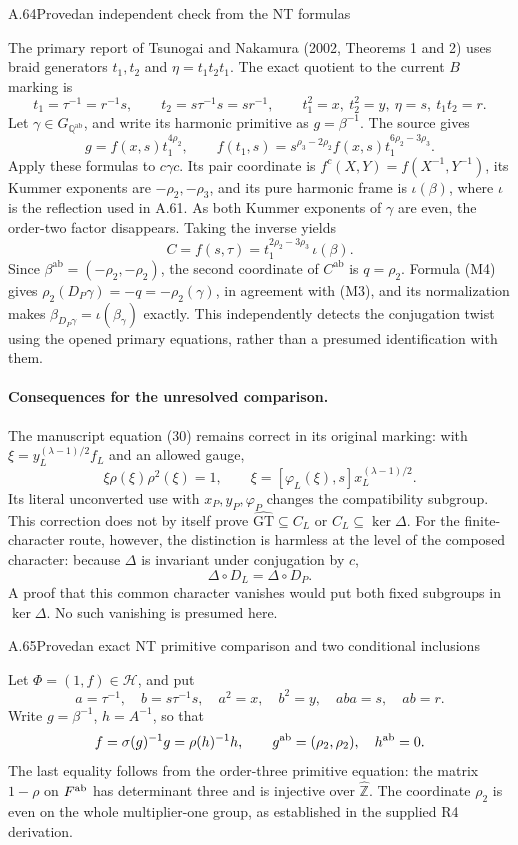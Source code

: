 \begin{statement}{A.64}{Proved}{an independent check from the NT formulas}
\citep[Theorems 1 and 2]{LitTsunogaiNakamura2002}
\end{statement}
The primary report of Tsunogai and Nakamura (2002, Theorems 1 and 2)
uses braid generators $t_1,t_2$ and $\eta=t_1t_2t_1$.
The exact quotient to the current $B$ marking is
\[
 t_1=\tau^{-1}=r^{-1}s,\qquad t_2=s\tau^{-1}s=sr^{-1},
 \qquad t_1^2=x,\ t_2^2=y,\ \eta=s,\ t_1t_2=r.
\]
Let $\gamma\in G_{\mathbb Q^{\mathrm{ab}}}$, and write its harmonic
primitive as $g=\beta^{-1}$. The source gives
\[
 g=f(x,s)t_1^{4\rho_2},\qquad
 f(t_1,s)=s^{\rho_3-2\rho_2}f(x,s)t_1^{6\rho_2-3\rho_3}.
\]
Apply these formulas to $c\gamma c$. Its pair coordinate is
$f^c(X,Y)=f(X^{-1},Y^{-1})$, its Kummer exponents are
$-\rho_2,-\rho_3$, and its pure harmonic frame is $\iota(\beta)$,
where $\iota$ is the reflection used in A.61. As both Kummer
exponents of $\gamma$ are even, the order-two factor disappears.
Taking the inverse yields
\[
 C=f(s,\tau)
    =t_1^{2\rho_2-3\rho_3}\,\iota(\beta).
\]
Since $\beta^{\mathrm{ab}}=(-\rho_2,-\rho_2)$, the second
coordinate of $C^{\mathrm{ab}}$ is $q=\rho_2$.
Formula (M4) gives $\rho_2(D_P\gamma)=-q=-\rho_2(\gamma)$,
in agreement with (M3), and its normalization makes
$\beta_{D_P\gamma}=\iota(\beta_\gamma)$ exactly.
This independently detects the conjugation twist using the opened
primary equations, rather than a presumed identification with them.

\paragraph{Consequences for the unresolved comparison.}
The manuscript equation (30) remains correct in its original marking:
with $\xi=y_L^{(\lambda-1)/2}f_L$ and an allowed gauge,
\[
 \xi\rho(\xi)\rho^2(\xi)=1,\qquad
 \xi=[\varphi_L(\xi),s]x_L^{(\lambda-1)/2}.
\]
Its literal unconverted use with $x_P,y_P,\varphi_P$ changes the
compatibility subgroup. This correction does not by itself prove
$\widehat{\mathrm{GT}}\subseteq C_L$ or $C_L\subseteq\ker\Delta$.
For the finite-character route, however, the distinction is harmless
at the level of the composed character: because $\Delta$ is invariant
under conjugation by $c$,
\[
                         \Delta\circ D_L=\Delta\circ D_P.
\]
A proof that this common character vanishes would put both fixed
subgroups in $\ker\Delta$. No such vanishing is presumed here.

\begin{statement}{A.65}{Proved}{an exact NT primitive comparison and two conditional inclusions}
\citep[Theorems 1 and 2]{LitTsunogaiNakamura2002}
\end{statement}
Let $\Phi=(1,f)\in\mathcal H$, and put
\[
 a=\tau^{-1},\quad b=s\tau^{-1}s,\quad a^2=x,\quad b^2=y,
 \quad aba=s,\quad ab=r.
\]
Write $g=\beta^{-1}$, $h=A^{-1}$, so that
\[
 f=\sigma(g)^{-1}g=\rho(h)^{-1}h,
 \qquad g^{\rm ab}=(\rho_2,\rho_2),\quad h^{\rm ab}=0.
\]
The last equality follows from the order-three primitive equation:
the matrix $1-\rho$ on $F^{\rm ab}$ has determinant three and is
injective over $\widehat{\mathbb Z}$. The coordinate $\rho_2$ is even
on the whole multiplier-one group, as established in the supplied
R4 derivation.

